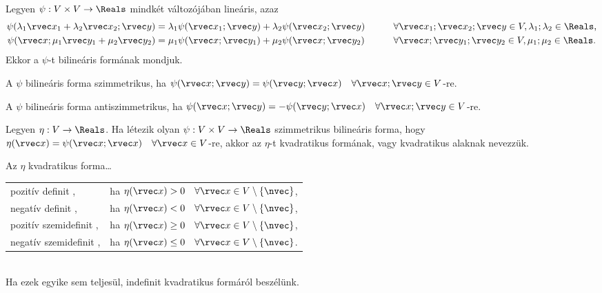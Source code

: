 \begin{definition}
  Legyen $\psi: V \times V \to \Reals$ mindkét változójában lineáris, azaz
  \begin{alignat*}{9}
    \psi(\lambda_1 \rvec x_1 + \lambda_2 \rvec x_2; \rvec y)
     & = \lambda_1 \psi(\rvec x_1; \rvec y) + \lambda_2 \psi(\rvec x_2; \rvec y)           &
     & \qquad \forall \rvec x_1; \rvec x_2; \rvec y \in V, \lambda_1; \lambda_2 \in \Reals
    \text,
    \\
    \psi(\rvec x; \mu_1 \rvec y_1 + \mu_2 \rvec y_2)
     & = \mu_1 \psi(\rvec x; \rvec y_1) + \mu_2 \psi(\rvec x; \rvec y_2)                   &
     & \qquad \forall \rvec x; \rvec y_1; \rvec y_2 \in V, \mu_1; \mu_2 \in \Reals
    \text.
  \end{alignat*}
  Ekkor a $\psi$-t bilineáris formának mondjuk.
\end{definition}

\begin{note}
  A $\psi$ bilineáris forma szimmetrikus, ha
  $\psi(\rvec x; \rvec y) = \psi(\rvec y; \rvec x)
    \quad \forall \rvec x; \rvec y \in V$-re.

  A $\psi$ bilineáris forma antiszimmetrikus, ha
  $\psi(\rvec x; \rvec y) = -\psi(\rvec y; \rvec x)
    \quad \forall \rvec x; \rvec y \in V$-re.
\end{note}

\begin{definition}
  Legyen $\eta: V \to \Reals$. Ha létezik olyan $\psi: V \times V \to \Reals$
  szimmetrikus bilineáris forma, hogy $\eta(\rvec x) = \psi(\rvec x; \rvec x)
    \quad \forall \rvec x \in V$-re, akkor az $\eta$-t kvadratikus formának,
  vagy kvadratikus alaknak nevezzük.

  Az $\eta$ kvadratikus forma\dots\\[.33em]
  \def\arraystretch{1.33}
  \begin{tabular}{>{\bullet\;}l<{,}l}
    pozitív definit      & ha $\eta(\rvec x) > 0 \quad \forall \rvec x \in V \setminus \{\nvec\}$,    \\
    negatív definit      & ha $\eta(\rvec x) < 0 \quad \forall \rvec x \in V \setminus \{\nvec\}$,    \\
    pozitív szemidefinit & ha $\eta(\rvec x) \geq 0 \quad \forall \rvec x \in V \setminus \{\nvec\}$, \\
    negatív szemidefinit & ha $\eta(\rvec x) \leq 0 \quad \forall \rvec x \in V \setminus \{\nvec\}$. \\
  \end{tabular}\\[.33em]
  Ha ezek egyike sem teljesül, indefinit kvadratikus formáról beszélünk.
\end{definition}

